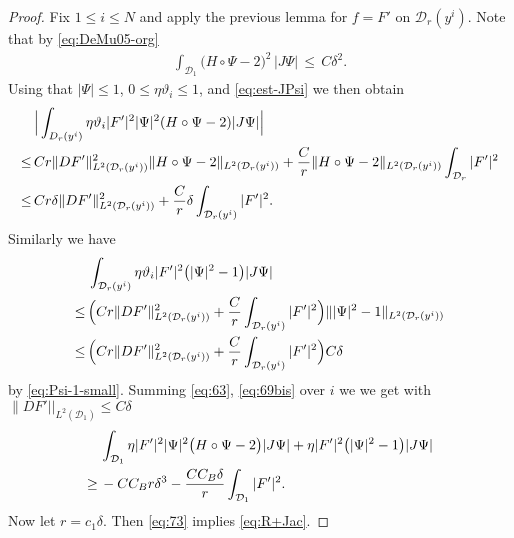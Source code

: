 \documentclass[reqno,makeidx,12pt]{amsart}
\theoremstyle{note}
\theoremstyle{definition}
\begin{document}
\begin{proof}
Fix $1\leq i\leq N$ and apply the previous lemma for $f=F'$ on ${\mathcal{D}}_r(y^i)$. 
Note that by \eqref{eq:DeMu05-org}
\begin{gather*}
	\int_{{\mathcal{D}}_1} \big(H\circ\Psi -2\big)^2\,|J\Psi| \,\leq\, C\delta^2.
\end{gather*}
Using that $|\Psi|\leq 1$, $0\leq\eta\vartheta_i\leq 1$, and \eqref{eq:est-JPsi} we then obtain
\begin{align}
	&\Big| \int_{D_r(y^i)} \eta \vartheta_i |F'|^2 |\Psi|^2 (H\circ\Psi-2) |J\Psi| \Big| \notag\\
	\leq\,& Cr \|DF'\|_{L^2({\mathcal{D}}_r(y^i))}^2\|H\circ\Psi-2\|_{L^2({\mathcal{D}}_r(y^i))} 
	+ \frac{C}{r}\|H\circ\Psi-2\|_{L^2({\mathcal{D}}_r(y^i))}\int_{{\mathcal{D}}_r} |F'|^2 \notag\\	
	\leq\,& Cr\delta \|DF'\|_{L^2({\mathcal{D}}_r(y^i))}^2 + \frac{C}{r}\delta \int_{{\mathcal{D}}_r(y^i)} |F'|^2. \label{eq:63}
\end{align}
Similarly we have
\begin{align}
	&\int_{{\mathcal{D}}_r(y^i)} \eta\vartheta_i |F'|^2\big(|\Psi|^2-1\big)|J\Psi| \notag\\
	\leq\, &\Big(Cr \|DF'\|_{L^2({\mathcal{D}}_r(y^i))}^2+\frac{C}{r}\int_{{\mathcal{D}}_r(y^i)}|F'|^2\Big)\||\Psi|^2-1\|_{L^2({\mathcal{D}}_r(y^i))} \notag\\
	\leq\, &\Big(Cr \|DF'\|_{L^2({\mathcal{D}}_r(y^i))}^2+\frac{C}{r}\int_{{\mathcal{D}}_r(y^i)}|F'|^2\Big)C\delta \label{eq:69bis}
\end{align}
by \eqref{eq:Psi-1-small}. Summing \eqref{eq:63}, \eqref{eq:69bis} over $i$ we we get with $\|DF'||_{L^2({\mathcal{D}}_1)}\leq C\delta$
\begin{align}
	&\int_{{\mathcal{D}}_1} \eta|F'|^2|\Psi|^2\big(H\circ\Psi-2\big)|J\Psi| + \eta|F'|^2\big(|\Psi|^2-1\big)|J\Psi| \notag\\
	\geq\, & -CC_Br\delta^3 -\frac{CC_B\delta}{r}\int_{{\mathcal{D}}_1}|F'|^2. \label{eq:73}
\end{align}
Now let $r = c_1 \delta$. Then \eqref{eq:73} implies \eqref{eq:R+Jac}.
\end{proof}
\end{document}
